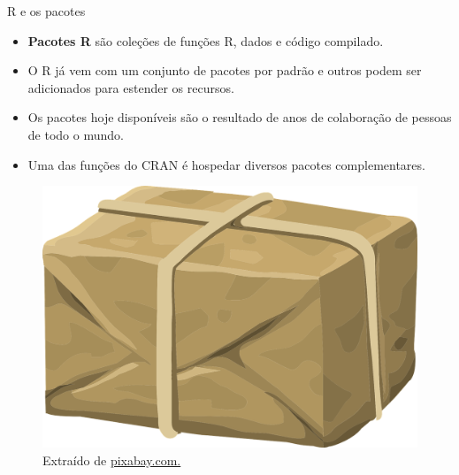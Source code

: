 \documentclass[
  ignorenonframetext,
  serif,
  professionalfont,
  usenames,
  dvipsnames,
  aspectratio = 169]{beamer}
\def\beginAHalfColumn{\begin{minipage}{0.49\textwidth}}%
\def\endColumns{\end{minipage}}%
\begin{document}
\begin{frame}{R e os pacotes}
\protect\hypertarget{r-e-os-pacotes}{}
\beginAHalfColumn

\begin{itemize}
\item
  \textbf{Pacotes R} são coleções de funções R, dados e código
  compilado.
\item
  O R já vem com um conjunto de pacotes por padrão e outros podem ser
  adicionados para estender os recursos.
\item
  Os pacotes hoje disponíveis são o resultado de anos de colaboração de
  pessoas de todo o mundo.
\item
  Uma das funções do CRAN é hospedar diversos pacotes complementares.
\end{itemize}

\endColumns
\beginAHalfColumn

\begin{figure}

{\centering \includegraphics[width=0.6\linewidth]{./img/pacote} 

}

\caption{Extraído de \href{https://cdn.pixabay.com/photo/2014/12/21/23/35/parcel-575623_960_720.png}{pixabay.com.}}\label{fig:unnamed-chunk-9}
\end{figure}

\endColumns
\end{frame}
\end{document}
